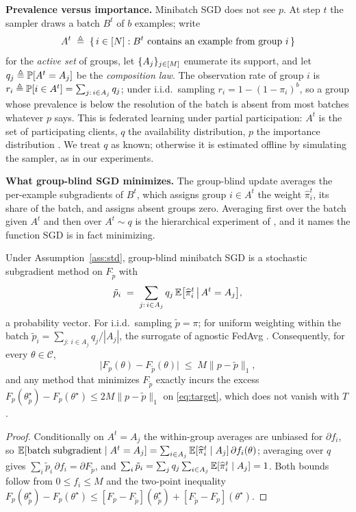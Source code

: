\noindent\textbf{Prevalence versus importance.}
Minibatch SGD does not see $p$. At step $t$ the sampler draws a batch $B^t$ of
$b$ examples; write
\[
A^t\;\triangleq\;\{\,i\in\Nn{N}: B^t\ \text{contains an example from group }i\,\}
\]
for the \emph{active set} of groups, let $\{A_j\}_{j\in[M]}$ enumerate its
support, and let $q_j\triangleq\mathbb{P}[A^t=A_j]$ be the \emph{composition law}.
The observation rate of group $i$ is $r_i\triangleq\mathbb{P}[i\in A^t]=\sum_{j:\,i\in A_j}q_j$;
under i.i.d.\ sampling $r_i=1-(1-\pi_i)^b$, so a group whose prevalence is
below the resolution of the batch is absent from most batches whatever $p$
says. This is federated learning under partial participation: $A^t$ is the set
of participating clients, $q$ the availability distribution, $p$ the
importance distribution \cite{rahimi2025fedavot,rahimi2025agnostic}. We treat
$q$ as known; otherwise it is estimated offline by simulating the sampler, as
in our experiments.

\noindent\textbf{What group-blind SGD minimizes.}
The group-blind update averages the per-example subgradients of $B^t$, which
assigns group $i\in A^t$ the weight $\widehat{\pi}^t_i$, its share of the
batch, and assigns absent groups zero. Averaging first over the batch given
$A^t$ and then over $A^t\sim q$ is the hierarchical experiment of
\cite[Eq.~4]{rahimi2025agnostic}, and it names the function SGD is in fact
minimizing.

\begin{proposition}
\label{prop:surrogate}
Under Assumption~\ref{ass:std}, group-blind minibatch SGD is a stochastic
subgradient method on $F_{\tilde p}$ with
\begin{equation}
\tilde p_i\;=\;\sum_{j:\,i\in A_j} q_j\,\mathbb{E}\big[\widehat{\pi}^t_i\,\big|\,A^t=A_j\big],
\label{eq:ptilde}
\end{equation}
a probability vector. For i.i.d.\ sampling $\tilde p=\pi$; for uniform
weighting within the batch $\tilde p_i=\sum_{j:\,i\in A_j}q_j/|A_j|$, the
surrogate of agnostic \textsf{FedAvg} \cite[Eq.~2]{rahimi2025fedavot}.
Consequently, for every $\theta\in\mathcal{C}$,
\begin{equation}
\big|F_p(\theta)-F_{\tilde p}(\theta)\big|\;\le\;M\|p-\tilde p\|_1 ,
\label{eq:surrogate-gap}
\end{equation}
and any method that minimizes $F_{\tilde p}$ exactly incurs the excess
$F_p(\theta^\star_{\tilde p})-F_p(\theta^\star)\le 2M\|p-\tilde p\|_1$ on
\eqref{eq:target}, which does not vanish with $T$.
\end{proposition}
\begin{proof}
Conditionally on $A^t=A_j$ the within-group averages are unbiased for
$\partial f_i$, so
$\mathbb{E}[\text{batch subgradient}\mid A^t=A_j]=\sum_{i\in A_j}\mathbb{E}[\widehat\pi^t_i\mid A_j]\,\partial f_i(\theta)$;
averaging over $q$ gives $\sum_i\tilde p_i\,\partial f_i=\partial F_{\tilde p}$,
and $\sum_i\tilde p_i=\sum_j q_j\sum_{i\in A_j}\mathbb{E}[\widehat\pi^t_i\mid A_j]=1$.
Both bounds follow from $0\le f_i\le M$ and the two-point inequality
$F_p(\theta^\star_{\tilde p})-F_p(\theta^\star)\le
[F_p-F_{\tilde p}](\theta^\star_{\tilde p})+[F_{\tilde p}-F_p](\theta^\star)$.
\end{proof}

